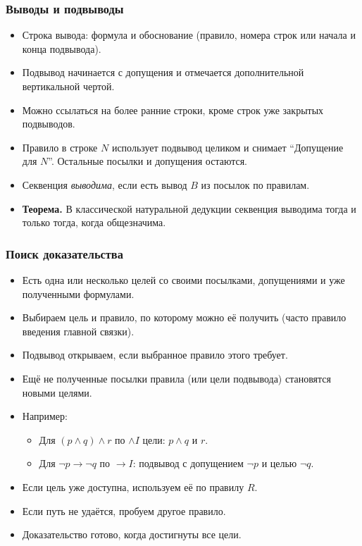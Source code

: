 \documentclass[10pt]{beamer}
\begin{document}
\begin{frame}
    \frametitle{Выводы и подвыводы}
    \begin{itemize}
        \item Строка вывода: формула и обоснование (правило, номера строк или начала и конца подвывода).
        \item Подвывод начинается с допущения и отмечается дополнительной вертикальной чертой. \pause
        \item Можно ссылаться на более ранние строки, кроме строк уже закрытых подвыводов.
        \item Правило в строке $N$ использует подвывод целиком и снимает \enquote{Допущение для $N$}. Остальные посылки и допущения остаются. \pause
        \item Секвенция \emph{выводима}, если есть вывод $B$ из посылок по правилам. \pause
        \item \textbf{Теорема.} В классической натуральной дедукции секвенция выводима тогда и только тогда, когда общезначима.
    \end{itemize}
\end{frame}

\begin{frame}
    \frametitle{Поиск доказательства}
    \begin{itemize}
        \item Есть одна или несколько целей со своими посылками, допущениями и уже полученными формулами. \pause
        \item Выбираем цель и правило, по которому можно её получить (часто правило введения главной связки).
        \item Подвывод открываем, если выбранное правило этого требует.
        \item Ещё не полученные посылки правила (или цели подвывода) становятся новыми целями. \pause
        \item Например:
        \begin{itemize}
            \item Для $(p\land q)\land r$ по $\land I$ цели: $p\land q$ и $r$.
            \item Для $\neg p\to\neg q$ по $\to I$: подвывод с допущением $\neg p$ и целью $\neg q$.
        \end{itemize} \pause
        \item Если цель уже доступна, используем её по правилу $R$.
        \item Если путь не удаётся, пробуем другое правило.
        \item Доказательство готово, когда достигнуты все цели.
    \end{itemize}
\end{frame}
\end{document}

